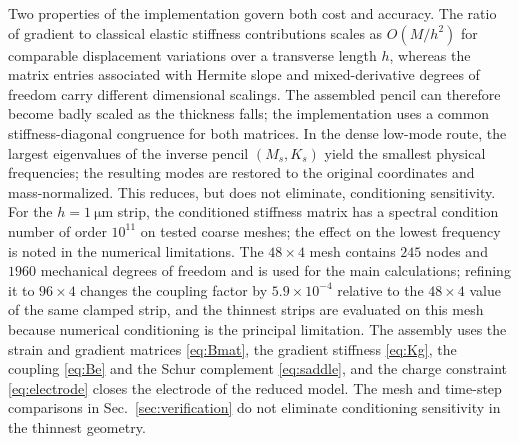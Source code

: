 Two properties of the implementation govern both cost and accuracy. The
ratio of gradient to classical elastic stiffness contributions scales as
$O(M/h^2)$ for comparable displacement variations over a transverse
length $h$, whereas the matrix entries associated with Hermite slope and
mixed-derivative degrees of freedom carry different dimensional scalings.
The assembled pencil can therefore become badly scaled as the thickness falls;
the implementation uses a common stiffness-diagonal congruence for both
matrices. In the dense low-mode route, the largest eigenvalues of the inverse
pencil $(M_s,K_s)$ yield the smallest physical frequencies; the resulting
modes are restored to the original coordinates and mass-normalized. This
reduces, but does not eliminate, conditioning sensitivity. For the $h=\SI{1}{\micro\meter}$ strip, the conditioned
stiffness matrix has a spectral condition number of order $10^{11}$ on tested
coarse meshes; the effect on the lowest frequency is noted in the numerical limitations. The $48\times4$ mesh contains $245$ nodes and $1960$ mechanical
degrees of freedom and is used for the main calculations; refining it to $96\times4$
changes the coupling factor by $5.9\times10^{-4}$ relative to the $48\times4$
value of the same clamped strip, and the thinnest strips are evaluated on this mesh because numerical
conditioning is the principal limitation. The assembly uses the strain and gradient matrices
\eqref{eq:Bmat}, the gradient stiffness \eqref{eq:Kg}, the coupling
\eqref{eq:Be} and the Schur complement \eqref{eq:saddle}, and the charge
constraint \eqref{eq:electrode} closes the electrode of the reduced model.
The mesh and time-step comparisons in Sec.~\ref{sec:verification} do not eliminate
conditioning sensitivity in the thinnest geometry.

\FloatBarrier
